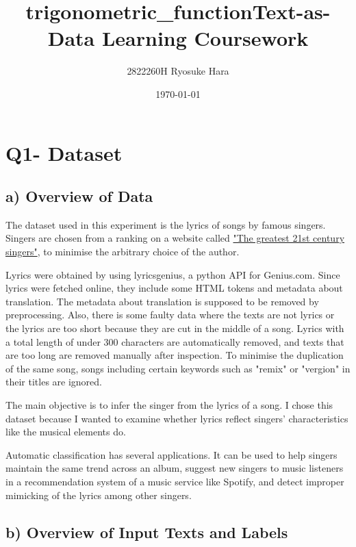 \documentclass[a4paper,11pt]{article}
\title{\vspace{-10cm}trigonometric_function}
\begin{document}
\title{Text-as-Data Learning Coursework}
\author{2822260H Ryosuke Hara}
\date{\today}
\maketitle

\section{Q1- Dataset}
\subsection{a) Overview of Data}%
The dataset used in this experiment is the lyrics of songs by famous singers. 
Singers are chosen from a ranking on a website called \href{https://www.thefamouspeople.com/21st-century-singers.php}{"The greatest 21st century singers"}, to minimise the arbitrary choice of the author.

Lyrics were obtained by using lyricsgenius, a python API for Genius.com.
Since lyrics were fetched online, they include some HTML tokens and metadata about translation.
The metadata about translation is supposed to be removed by preprocessing.
Also, there is some faulty data where the texts are not lyrics or the lyrics are too short because they are cut in the middle of a song.
Lyrics with a total length of under 300 characters are automatically removed, and texts that are too long are removed manually after inspection.
To minimise the duplication of the same song, songs including certain keywords such as "remix" or "vergion" in their titles are ignored.


The main objective is to infer the singer from the lyrics of a song.
I chose this dataset because I wanted to examine whether lyrics reflect singers' characteristics like the musical elements do.

Automatic classification has several applications.
It can be used to help singers maintain the same trend across an album,
suggest new singers to music listeners in a recommendation system of a music service like Spotify, and
detect improper mimicking of the lyrics among other singers. 

\subsection{b) Overview of Input Texts and Labels}
\end{document}
